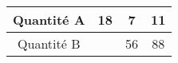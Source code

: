 \begin{tabular}{|c|c|c|c|}
\hline
Quantité A & 18 & 7 & 11 \\ \hline
Quantité B & \kern1cm & 56 & 88 \\ \hline
\end{tabular}

